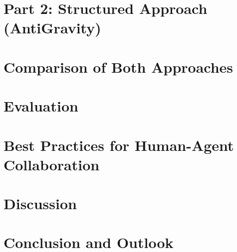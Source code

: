 \documentclass[
  draft=false,
  openany,
  english,
  fontsize=12pt,
  paper=a4,
  twoside=false,
  parskip=half,
  sfdefaults=false,
  titlepage=true,
  toc=flat,
  toc=chapterentrywithdots,
  toc=sectionentrywithdots,
  bibliography=totoc,
  captions=nooneline,
  captions=tablebelow,
  chapterprefix=false,
  headings=normal
]{scrbook}
\begin{document}
\chapter{Part 2: Structured Approach (AntiGravity)}









\chapter{Comparison of Both Approaches}



\chapter{Evaluation}







\chapter{Best Practices for Human-Agent Collaboration}







\chapter{Discussion}



\chapter{Conclusion and Outlook}




\end{document}

